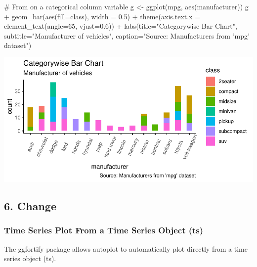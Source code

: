 \documentclass[a4paper]{article}
\newenvironment{Shaded}{}{}
\newcommand{\KeywordTok}[1]{\textcolor[rgb]{0.00,0.00,1.00}{#1}}
\newcommand{\DataTypeTok}[1]{#1}
\newcommand{\DecValTok}[1]{#1}
\newcommand{\FloatTok}[1]{#1}
\newcommand{\StringTok}[1]{\textcolor[rgb]{0.00,0.50,0.50}{#1}}
\newcommand{\CommentTok}[1]{\textcolor[rgb]{0.00,0.50,0.00}{#1}}
\newcommand{\OperatorTok}[1]{#1}
\newcommand{\NormalTok}[1]{#1}
\begin{document}
\begin{Shaded}
\begin{Highlighting}[]
\CommentTok{# From on a categorical column variable}
\NormalTok{g <-}\StringTok{ }\KeywordTok{ggplot}\NormalTok{(mpg, }\KeywordTok{aes}\NormalTok{(manufacturer))}
\NormalTok{g }\OperatorTok{+}\StringTok{ }\KeywordTok{geom_bar}\NormalTok{(}\KeywordTok{aes}\NormalTok{(}\DataTypeTok{fill=}\NormalTok{class), }\DataTypeTok{width =} \FloatTok{0.5}\NormalTok{) }\OperatorTok{+}\StringTok{ }
\StringTok{  }\KeywordTok{theme}\NormalTok{(}\DataTypeTok{axis.text.x =} \KeywordTok{element_text}\NormalTok{(}\DataTypeTok{angle=}\DecValTok{65}\NormalTok{, }\DataTypeTok{vjust=}\FloatTok{0.6}\NormalTok{)) }\OperatorTok{+}
\StringTok{  }\KeywordTok{labs}\NormalTok{(}\DataTypeTok{title=}\StringTok{"Categorywise Bar Chart"}\NormalTok{, }
       \DataTypeTok{subtitle=}\StringTok{"Manufacturer of vehicles"}\NormalTok{, }
       \DataTypeTok{caption=}\StringTok{"Source: Manufacturers from 'mpg' dataset"}\NormalTok{)}
\end{Highlighting}
\end{Shaded}

\includegraphics{M24-ggplot2_Gallery_files/figure-latex/unnamed-chunk-40-1.pdf}

\newpage  

\subsection{6. Change}\label{change}

\subsubsection{Time Series Plot From a Time Series Object
(ts)}\label{time-series-plot-from-a-time-series-object-ts}

The ggfortify package allows autoplot to automatically plot directly
from a time series object (ts).
\end{document}
